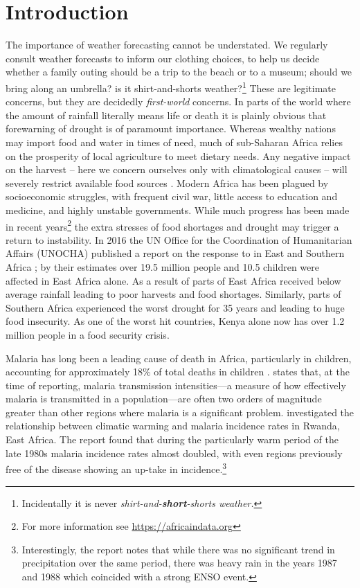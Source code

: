 \section{Introduction}

The importance of weather forecasting cannot be understated. We regularly
consult weather forecasts to inform our clothing choices, to help us decide
whether a family outing should be a trip to the beach or to a museum; should we
bring along an umbrella? is it shirt-and-shorts weather?\footnote{Incidentally
  it is never \emph{shirt-and-\textbf{short}-shorts weather.}} These are
legitimate concerns, but they are decidedly \emph{first-world} concerns. In
parts of the world where the amount of rainfall literally means life or death it
is plainly obvious that forewarning of drought is of paramount importance.
Whereas wealthy nations may import food and water in times of need, much of
sub-Saharan Africa relies on the prosperity of local agriculture to meet dietary
needs. Any negative impact on the harvest -- here we concern ourselves only with
climatological causes -- will severely restrict available food sources
\citep{development2006mapping}. Modern Africa has been plagued by socioeconomic
struggles, with frequent civil war, little access to education and medicine, and
highly unstable governments. While much progress has been made in recent
years\footnote{For more information see \url{https://africaindata.org}} the
extra stresses of food shortages and drought may trigger a return to
instability.
In 2016 the UN Office for the Coordination of Humanitarian Affairs (UNOCHA)
published a report on the response to \elnino{} in East and Southern Africa
\citep{unocha2016}; by their estimates over 19.5 million people and 10.5
children were affected in East Africa alone. As a result of \elnino{} parts of
East Africa received below average rainfall leading to poor harvests and food
shortages. Similarly, parts of Southern Africa experienced the worst drought for
35 years and leading to huge food insecurity. As one of the worst hit countries,
Kenya alone now has over 1.2 million people in a food security crisis.

Malaria has long been a leading cause of death in Africa, particularly in
children, accounting for approximately 18\% of total deaths in children
\citep{IMHE2016}. \citet{alles1998} states that, at the time of reporting,
malaria transmission intensities---a measure of how effectively malaria is
transmitted in a population---are often two orders of magnitude greater than other
regions where malaria is a significant problem. \cite{loevinsohn1994}
investigated the relationship between climatic warming and malaria incidence
rates in Rwanda, East Africa. The report found that during the particularly warm
period of the late 1980s malaria incidence rates almost doubled, with even
regions previously free of the disease showing an up-take in
incidence.\footnote{Interestingly, the report notes that while there was no
  significant trend in precipitation over the same period, there was heavy rain
  in the years 1987 and 1988 which coincided with a strong ENSO event.}

